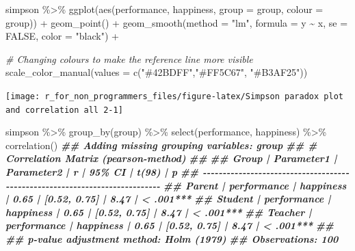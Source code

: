 \documentclass[
]{book}
\newenvironment{Shaded}{\begin{snugshade}}{\end{snugshade}}
\newcommand{\AttributeTok}[1]{\textcolor[rgb]{0.77,0.63,0.00}{#1}}
\newcommand{\CommentTok}[1]{\textcolor[rgb]{0.56,0.35,0.01}{\textit{#1}}}
\newcommand{\ConstantTok}[1]{\textcolor[rgb]{0.00,0.00,0.00}{#1}}
\newcommand{\DocumentationTok}[1]{\textcolor[rgb]{0.56,0.35,0.01}{\textbf{\textit{#1}}}}
\newcommand{\FunctionTok}[1]{\textcolor[rgb]{0.00,0.00,0.00}{#1}}
\newcommand{\NormalTok}[1]{#1}
\newcommand{\SpecialCharTok}[1]{\textcolor[rgb]{0.00,0.00,0.00}{#1}}
\newcommand{\StringTok}[1]{\textcolor[rgb]{0.31,0.60,0.02}{#1}}
\begin{document}
\begin{Shaded}
\begin{Highlighting}[]
\NormalTok{simpson }\SpecialCharTok{\%\textgreater{}\%} 
  \FunctionTok{ggplot}\NormalTok{(}\FunctionTok{aes}\NormalTok{(performance, happiness, }\AttributeTok{group =}\NormalTok{ group, }\AttributeTok{colour =}\NormalTok{ group)) }\SpecialCharTok{+}
  \FunctionTok{geom\_point}\NormalTok{() }\SpecialCharTok{+}
  \FunctionTok{geom\_smooth}\NormalTok{(}\AttributeTok{method =} \StringTok{"lm"}\NormalTok{,}
              \AttributeTok{formula =}\NormalTok{ y }\SpecialCharTok{\textasciitilde{}}\NormalTok{ x,}
              \AttributeTok{se =} \ConstantTok{FALSE}\NormalTok{,}
              \AttributeTok{color =} \StringTok{"black"}\NormalTok{) }\SpecialCharTok{+}
  
  \CommentTok{\# Changing colours to make the reference line more visible}
  \FunctionTok{scale\_color\_manual}\NormalTok{(}\AttributeTok{values =} \FunctionTok{c}\NormalTok{(}\StringTok{"\#42BDFF"}\NormalTok{,}\StringTok{"\#FF5C67"}\NormalTok{, }\StringTok{"\#B3AF25"}\NormalTok{))}
\end{Highlighting}
\end{Shaded}

\begin{center}\texttt{[image: r\_for\_non\_programmers\_files/figure-latex/Simpson paradox plot and correlation all 2-1]} \end{center}

\begin{Shaded}
\begin{Highlighting}[]

\NormalTok{simpson }\SpecialCharTok{\%\textgreater{}\%} 
  \FunctionTok{group\_by}\NormalTok{(group) }\SpecialCharTok{\%\textgreater{}\%} 
  \FunctionTok{select}\NormalTok{(performance, happiness) }\SpecialCharTok{\%\textgreater{}\%} 
  \FunctionTok{correlation}\NormalTok{()}
\DocumentationTok{\#\# Adding missing grouping variables: \textasciigrave{}group\textasciigrave{}}
\DocumentationTok{\#\# \# Correlation Matrix (pearson{-}method)}
\DocumentationTok{\#\# }
\DocumentationTok{\#\# Group   |  Parameter1 | Parameter2 |    r |       95\% CI | t(98) |         p}
\DocumentationTok{\#\# {-}{-}{-}{-}{-}{-}{-}{-}{-}{-}{-}{-}{-}{-}{-}{-}{-}{-}{-}{-}{-}{-}{-}{-}{-}{-}{-}{-}{-}{-}{-}{-}{-}{-}{-}{-}{-}{-}{-}{-}{-}{-}{-}{-}{-}{-}{-}{-}{-}{-}{-}{-}{-}{-}{-}{-}{-}{-}{-}{-}{-}{-}{-}{-}{-}{-}{-}{-}{-}{-}{-}{-}{-}{-}{-}{-}}
\DocumentationTok{\#\# Parent  | performance |  happiness | 0.65 | [0.52, 0.75] |  8.47 | \textless{} .001***}
\DocumentationTok{\#\# Student | performance |  happiness | 0.65 | [0.52, 0.75] |  8.47 | \textless{} .001***}
\DocumentationTok{\#\# Teacher | performance |  happiness | 0.65 | [0.52, 0.75] |  8.47 | \textless{} .001***}
\DocumentationTok{\#\# }
\DocumentationTok{\#\# p{-}value adjustment method: Holm (1979)}
\DocumentationTok{\#\# Observations: 100}
\end{Highlighting}
\end{Shaded}
\end{document}

